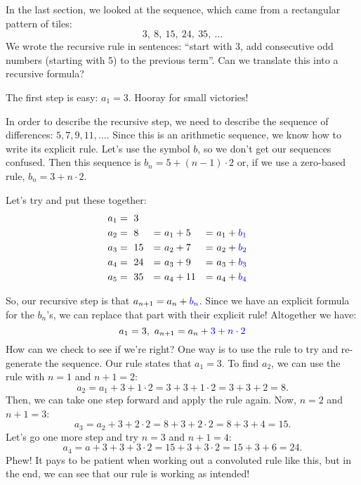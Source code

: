 In the last section, we looked at the sequence, which came from a rectangular pattern of tiles: \[3,~ 8,~ 15,~ 24,~ 35,~\dotsc\]
We wrote the recursive rule in sentences: ``start with 3, add consecutive odd numbers (starting with 5) to the previous term''. Can we translate this into a recursive formula?

The first step is easy: $a_1 = 3$. Hooray for small victories!

In order to describe the recursive step, we need to describe the sequence of differences: $5, 7, 9, 11, \dotsc$. Since this is an arithmetic sequence, we know how to write its explicit rule. Let's use the symbol $b$, so we don't get our sequences confused. Then this sequence is {\color{blue!90!black}$b_n = 5 + (n-1)\cdot 2$} or, if we use a zero-based rule, {\color{blue!90!black}$b_n = 3 + n\cdot 2$}.

Let's try and put these together:
\[\begin{aligned}
a_1 &=~3\\
a_2 &=~8	&=~& a_1 + 5		&=~& a_1 + {\color{blue!90!black}b_1}\\
a_3 &=~15	&=~& a_2 + 7		&=~& a_2 + {\color{blue!90!black}b_2}\\
a_4 &=~24	&=~& a_3 + 9		&=~& a_3 + {\color{blue!90!black}b_3}\\
a_5 &=~35	&=~& a_4 + 11		&=~& a_4 + {\color{blue!90!black}b_4}
\end{aligned}\]

So, our recursive step is that $a_{n+1} = a_n + {\color{blue!90!black}b_n}$. Since we have an explicit formula for the $b_n$'s, we can replace that part with their explicit rule! Altogether we have: \[a_1 = 3, ~ a_{n+1} = a_n + {\color{blue!90!black}3 + n\cdot 2}\]
How can we check to see if we're right? One way is to use the rule to try and re-generate the sequence. Our rule states that $a_1 = 3$. To find $a_2$, we can use the rule with $n=1$ and $n+1 = 2$:
\[a_2 = a_1 + 3 + 1 \cdot 2 = 3 + 3 + 1 \cdot 2 = 3 + 3 + 2 = 8.\]
Then, we can take one step forward and apply the rule again. Now, $n=2$ and $n+1 = 3$:
\[a_3 = a_2 + 3 + 2 \cdot 2 = 8 + 3 + 2 \cdot 2 = 8 + 3 + 4 = 15.\]
Let's go one more step and try $n=3$ and $n+1=4$:
\[a_4 = a+3 + 3 + 3 \cdot 2 = 15 + 3 + 3 \cdot 2 = 15 + 3 + 6 = 24.\]
Phew! It pays to be patient when working out a convoluted rule like this, but in the end, we can see that our rule is working as intended!

